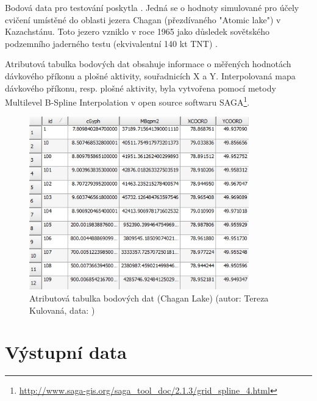 Bodová data pro testování poskytla . Jedná se o hodnoty
simulované pro účely cvičení umístěné do oblasti jezera Chagan
(přezdívaného "Atomic lake") v Kazachstánu. Toto jezero vzniklo v roce
1965 jako důsledek sovětského podzemního jaderného testu (ekvivalentní
140 kt TNT) \cite{Nordyke2000}.

Atributová tabulka bodových dat obsahuje informace o měřených
hodnotách dávkového příkonu a plošné aktivity, souřadnicích X a
Y. Interpolovaná mapa dávkového příkonu, resp. plošné aktivity, byla
vytvořena pomocí metody Multilevel B-Spline Interpolation v open
source  softwaru
SAGA\footnote{\url{http://www.saga-gis.org/saga_tool_doc/2.1.3/grid_spline_4.html}}.
  
\begin{figure}[H] \centering
      \includegraphics[width=270pt]{./pictures/chagan_attr.jpg}
      \caption[Atributová tabulka bodových dat (Chagan
      Lake)]{Atributová tabulka bodových dat (Chagan Lake) (autor:
        Tereza Kulovaná, data: )}
      \label{fig:attributes}
\end{figure}

\section{Výstupní data}

